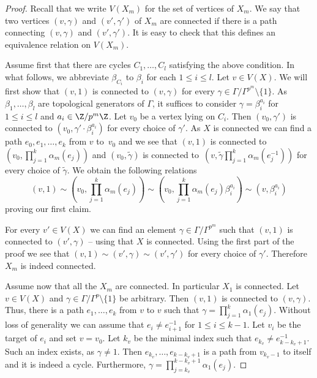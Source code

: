 \begin{proof}
	Recall that we write $V(X_m)$ for the set of vertices of $X_m$. We say that two vertices $(v,\gamma)$ and $(v',\gamma')$ of $X_m$ are connected if there is a path connecting $(v,\gamma)$ and $(v',\gamma')$. It is easy to check that this defines an equivalence relation on $V(X_m)$. 
	
	Assume first that there are cycles $C_1,\dots, C_l$ satisfying the above condition. In what follows, we abbreviate $\beta_{C_i}$ to $\beta_i$ for each ${1 \le i \le l}$. 
	Let $v\in V(X)$. We will first show that $(v,1)$ is connected to $(v,\gamma)$ for every ${\gamma\in \Gamma/\Gamma^{p^m} \setminus \{1\}}$. As ${\beta_1,\dots ,\beta_l}$ are topological generators of $\Gamma$, it suffices to consider ${\gamma=\beta_i^{a_i}}$ for $1\le i\le l$ and ${a_i\in \Z/p^m\Z}$. Let $v_0$ be a vertex lying on $C_i$. Then ${(v_0,\gamma')}$ is connected to ${(v_0,\gamma'\cdot \beta_i^{a_i})}$ for every choice of $\gamma'$. As $X$ is connected we can find a path ${e_0,e_1,\ldots, e_k}$ from $v$ to~$v_0$ and we see that $(v,1)$ is connected to ${(v_0,\prod_{j=1}^k\alpha_m(e_j))}$ and ${(v_0,\tilde{\gamma})}$ is connected to~${(v,\tilde{\gamma}\prod_{j=1}^k\alpha_m(e^{-1}_j))}$ for every choice of $\tilde{\gamma}$. We obtain the following relations
	\[\left(v,1\right)\sim \left(v_0,\prod_{j=1}^k \alpha_m(e_j)\right)\sim \left(v_0,\prod_{j=1}^k\alpha_m(e_j)\beta^{a_i}_i\right)\sim \left(v,\beta_i^{a_i}\right)\]
	proving our first claim. 
	
	For every $v'\in V(X)$ we can find an element $\gamma\in \Gamma/\Gamma^{p^m}$ such that $(v,1)$ is connected to $(v',\gamma)$ -- using that $X$ is connected. Using the first part of the proof we see that $(v,1)\sim (v',\gamma)\sim (v',\gamma')$ for every choice of $\gamma'$. Therefore $X_m$ is indeed connected. 
	
	Assume now that all the $X_m$ are connected. In particular $X_1$ is connected. Let $v\in V(X)$ and $\gamma\in \Gamma/\Gamma^p\setminus\{1\}$ be arbitrary. Then $(v,1)$ is connected to $(v,\gamma)$. Thus, there is a path $e_1,\dots, e_k$ from $v$ to $v$ such that $\gamma=\prod_{j=1}^k\alpha_1(e_j)$. Without loss of generality we can assume that $e_i\neq e^{-1}_{i+1}$ for $1\le i\le k-1$. Let $v_i$ be the target of $e_i$ and set $v=v_0$. Let $k_v$ be the minimal index such that $e_{k_v}\neq e^{-1}_{k-k_v+1}$. Such an index exists, as ${\gamma\neq 1}$. Then $e_{k_v},\dots ,e_{k-k_v+1}$ is a path from $v_{k_v-1}$ to itself and it is indeed a cycle. Furthermore, ${\gamma=\prod_{j=k_v}^{k-k_v+1}\alpha_1(e_j)}$. 
\end{proof} 


